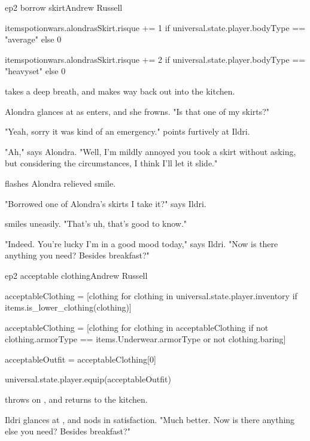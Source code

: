 \documentclass{book}
\begin{document}
\begin{childnode}{ep2 borrow skirt}{Andrew Russell}
    \begin{code}
        
        itemspotionwars.alondrasSkirt.risque += 1 if universal.state.player.bodyType == "average" else 0

        itemspotionwars.alondrasSkirt.risque += 2 if universal.state.player.bodyType == "heavyset" else 0

    \end{code}

    \name{} takes a deep breath, and makes \hisher{} way back out into the kitchen.

    Alondra glances at \name{} as \heshe{} enters, and she frowns. "Is that one of my skirts?"

    "Yeah, sorry it was kind of an emergency." \name{} points furtively at Ildri.

    "Ah," says Alondra. "Well, I'm mildly annoyed you took a skirt without asking, but considering the circumstances, I think I'll let it slide."

    \name{} flashes Alondra  relieved smile.

    "Borrowed one of Alondra's skirts I take it?" says Ildri. 

    \name{} smiles uneasily. "That's uh, that's good to know."

    "Indeed. You're lucky I'm in a good mood today," says Ildri. "Now is there anything you need? Besides breakfast?"


\end{childnode}

\begin{childnode}{ep2 acceptable clothing}{Andrew Russell}

    \begin{code}

        acceptableClothing = [clothing for clothing in universal.state.player.inventory if items.is\_lower\_clothing(clothing)]

        acceptableClothing = [clothing for clothing in acceptableClothing if not clothing.armorType == items.Underwear.armorType or not clothing.baring]

        acceptableOutfit = acceptableClothing[0]

        universal.state.player.equip(acceptableOutfit)

    \end{code}

    \name{} throws on \hisher{} \trousers{}, and returns to the kitchen.

    Ildri glances at \name{}, and nods in satisfaction. "Much better. Now is there anything else you need? Besides breakfast?"  


\end{childnode}
\end{document}
